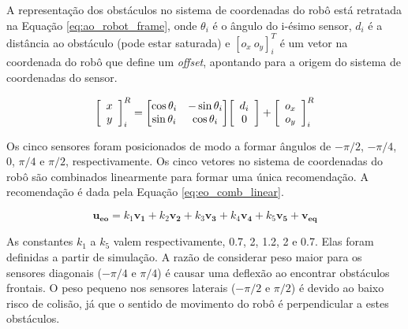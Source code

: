 		A representação dos obstáculos no sistema de coordenadas do robô está retratada na 
		Equação \ref{eq:ao_robot_frame}, onde $\theta_i$ é o ângulo do i-ésimo sensor, $d_i$ é a 
		distância ao obstáculo (pode estar saturada) e $[o_x\ o_y]_i^T$ é um vetor na coordenada
		do robô que define um \textit{offset}, apontando para a origem do sistema de coordenadas
		do sensor.
		
		\begin{equation}
			\label{eq:ao_robot_frame}
			\mleft[ 
			\begin{array}{c c}
				x \\ y
			\end{array}
			\mright]_i^R = \mleft[
			\begin{matrix}
		  		\cos{\theta_i} & -\sin{\theta_i} \\
		  		\sin{\theta_i} & \cos{\theta_i} \\
			\end{matrix}
			\mright] \mleft[ 
			\begin{array}{c c}
				d_i \\ 0
			\end{array}
			\mright] + \mleft[ 
			\begin{array}{c c}
				o_x \\ o_y
			\end{array}
			\mright]_i^R
		\end{equation}

		Os cinco sensores foram posicionados de modo a formar ângulos de $-\pi/2$, $-\pi/4$,
		$0$, $\pi/4$ e $\pi/2$, respectivamente. Os cinco vetores no sistema de coordenadas do 
		robô são combinados linearmente para formar uma única recomendação. A recomendação é 
		dada pela Equação \ref{eq:eo_comb_linear}.
		
		\begin{equation}
			\label{eq:eo_comb_linear}
			\mathbf{u_{eo}} = k_1 \mathbf{v_1} + k_2 \mathbf{v_2} + k_3 \mathbf{v_3} + 
			k_4 \mathbf{v_4} + k_5 \mathbf{v_5} + \mathbf{v_{eq}}
		\end{equation}
		
		As constantes $k_1$ a $k_5$ valem respectivamente, 0.7, 2, 1.2, 2 e 0.7. Elas
		foram definidas a partir de simulação. A razão de considerar peso maior para os sensores
		diagonais ($-\pi/4$ e $\pi/4$) é causar uma deflexão ao encontrar obstáculos frontais. 
		O peso pequeno nos sensores laterais ($-\pi/2$ e $\pi/2$) é devido ao baixo risco de 
		colisão, já que o sentido de movimento do robô é perpendicular a estes obstáculos.
		
